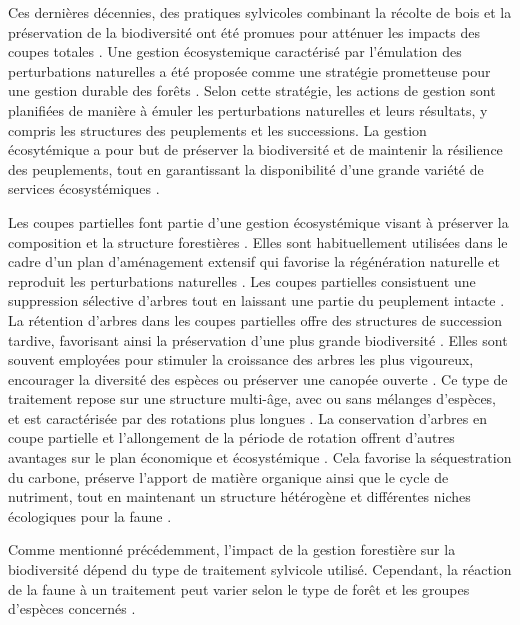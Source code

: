 Ces dernières décennies, des pratiques sylvicoles combinant la récolte de bois et la préservation de la biodiversité ont été promues pour atténuer les impacts des coupes totales \citep{Gustafsson2012Retentionforestry}.
Une gestion écosystemique caractérisé par l'émulation des perturbations naturelles a été proposée comme une stratégie prometteuse pour une gestion durable des forêts \citep{Perry1998scientificbasis,Kuuluvainen2002Naturalvariabilitya}. 
Selon cette stratégie, les actions de gestion sont planifiées de manière à émuler les perturbations naturelles et leurs résultats, y compris les structures des peuplements et les successions. 
La gestion écosytémique a pour but de préserver la biodiversité et de maintenir la résilience des peuplements, tout en garantissant la disponibilité d'une grande variété de services écosystémiques \citep{Szaro1998emergenceecosystem,MacDicken2015Globalprogress}.

Les coupes partielles font partie d'une gestion écosystémique visant à préserver la composition et la structure forestières \citep{Bergeron1999Forestmanagementa}.
Elles sont habituellement utilisées dans le cadre d'un plan d'aménagement extensif qui favorise la régénération naturelle et reproduit les perturbations naturelles \citep{Irland2011Timberproductivity}. 
Les coupes partielles consistuent une suppression sélective d'arbres tout en laissant une partie du peuplement intacte \citep{Ameray2021Forestcarbon}. 
La rétention d'arbres dans les coupes partielles offre des structures de succession tardive, favorisant ainsi la préservation d'une plus grande biodiversité \citep{Ameray2021Forestcarbon}.
Elles sont souvent employées pour stimuler la croissance des arbres les plus vigoureux, encourager la diversité des espèces ou préserver une canopée ouverte \citep{Irland2011Timberproductivity}.
Ce type de traitement repose sur une structure multi-âge, avec ou sans mélanges d'espèces, et est caractérisée par des rotations plus longues \citep{Kuuluvainen2009Forestmanagement}. 
La conservation d'arbres en coupe partielle et l'allongement de la période de rotation offrent d'autres avantages sur le plan économique et écosystémique \citep{Ameray2021Forestcarbon}. 
Cela favorise la séquestration du carbone, préserve l'apport de matière organique ainsi que le cycle de nutriment, tout en maintenant un structure hétérogène et différentes niches écologiques pour la faune \citep{Dahlgren1994effectswholetree,Barg1999Influencepartial,Tong2020Forestmanagement,Ameray2021Forestcarbon}.

Comme mentionné précédemment, l'impact de la gestion forestière sur la biodiversité dépend du type de traitement sylvicole utilisé. Cependant, la réaction de la faune à un traitement peut varier selon le type de forêt et les groupes d'espèces concernés \citep{Paillet2010Biodiversitydifferences,Kudrin2023metaanalysiseffects}.

